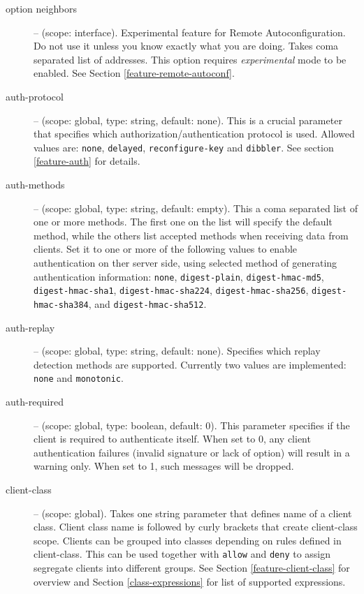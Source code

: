 \begin{description}
 \item[option neighbors] -- (scope: interface). Experimental feature
   for Remote Autoconfiguration. Do not use it unless you know exactly
   what you are doing. Takes coma separated list of addresses. This
   option requires \emph{experimental} mode to be enabled. See Section
   \ref{feature-remote-autoconf}.

\item[auth-protocol] -- (scope: global, type: string, default:
  none). This is a crucial parameter that specifies which
  authorization/authentication protocol is used. Allowed values are:
  \texttt{none}, \texttt{delayed}, \texttt{reconfigure-key} and
  \texttt{dibbler}. See section \ref{feature-auth} for details.

 \item[auth-methods] -- (scope: global, type: string, default:
   empty). This a coma separated list of one or more methods. The
   first one on the list will specify the default method, while the
   others list accepted methods when receiving data from clients.
   Set it to one or more of the following values to enable
   authentication on ther server side, using selected method of
   generating authentication information:
   \texttt{none}, \texttt{digest-plain}, \texttt{digest-hmac-md5},
   \texttt{digest-hmac-sha1}, \texttt{digest-hmac-sha224},
   \texttt{digest-hmac-sha256}, \texttt{digest-hmac-sha384},
   and \texttt{digest-hmac-sha512}. 

\item[auth-replay] -- (scope: global, type: string, default:
  none). Specifies which replay detection methods are
  supported. Currently two values are implemented: \texttt{none} and
  \texttt{monotonic}.

\item[auth-required] -- (scope: global, type: boolean, default:
  0). This parameter specifies if the client is required to
  authenticate itself. When set to 0, any client authentication
  failures (invalid signature or lack of  option) will
  result in a warning only. When set to 1, such messages will be
  dropped.

\item[client-class] -- (scope: global). Takes one string parameter
  that defines name of a client class. Client class name is followed
  by curly brackets that create client-class scope. Clients can be
  grouped into classes depending on rules defined in
  client-class. This can be used together with \verb+allow+ and
  \verb+deny+ to assign segregate clients into different groups. See
  Section \ref{feature-client-class} for overview and Section
  \ref{class-expressions} for list of supported expressions.


\end{description}
